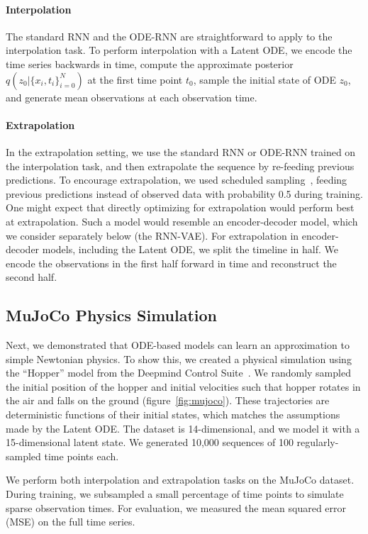 \documentclass{article}
\begin{document}
\paragraph{Interpolation}
The standard RNN and the ODE-RNN are straightforward to apply to the interpolation task.
To perform interpolation with a Latent ODE, we encode the time series backwards in time, compute the approximate posterior $q(z_0| \{x_i,t_i\}_{i=0}^N)$ at the first time point $t_0$, sample the initial state of ODE $z_0$, and generate mean observations at each observation time.

\paragraph{Extrapolation}
In the extrapolation setting, we use the standard RNN or ODE-RNN trained on the interpolation task, and then extrapolate the sequence by re-feeding previous predictions.
To encourage extrapolation, we used scheduled sampling~\citep{scheduled_sampling}, feeding previous predictions instead of observed data with probability 0.5 during training.
One might expect that directly optimizing for extrapolation would perform best at extrapolation.
Such a model would resemble an encoder-decoder model, which we consider separately below (the RNN-VAE).
For extrapolation in encoder-decoder models, including the Latent ODE, we split the timeline in half.
We encode the observations in the first half forward in time and reconstruct the second half.


\subsection{MuJoCo Physics Simulation}
\label{sec:mujoco}

Next, we demonstrated that ODE-based models can learn an approximation to simple Newtonian physics.
To show this, we created a physical simulation using the ``Hopper'' model from the Deepmind Control Suite~\citep{DeepMindControlSuite}.
We randomly sampled the initial position of the hopper and initial velocities such that hopper rotates in the air and falls on the ground (figure~\ref{fig:mujoco}).
These trajectories are deterministic functions of their initial states, which matches the assumptions made by the Latent ODE.
The dataset is 14-dimensional, and we model it with a 15-dimensional latent state.
We generated 10,000 sequences of 100 regularly-sampled time points each.



We perform both interpolation and extrapolation tasks on the MuJoCo dataset.
During training, we subsampled a small percentage of time points to simulate sparse observation times.
For evaluation, we measured the mean squared error (MSE) on the full time series.
\end{document}
